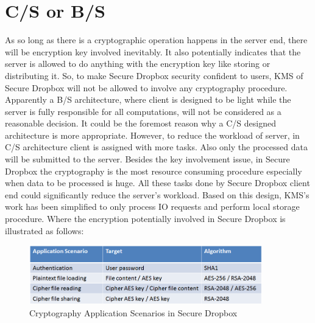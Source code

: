 \section{C/S or B/S}

As so long as there is a cryptographic operation happens in the server end, there will be encryption key involved inevitably. It also potentially indicates that the server is allowed to do anything with the encryption key like storing or distributing it. So, to make Secure Dropbox security confident to users, KMS of Secure Dropbox will not be allowed to involve any cryptography procedure. Apparently a B/S architecture, where client is designed to be light while the server is fully responsible for all computations, will not be considered as a reasonable decision. It could be the foremost reason why a C/S designed architecture is more appropriate. However, to reduce the workload of server, in C/S architecture client is assigned with more tasks. Also only the processed data will be submitted to the server. Besides the key involvement issue, in Secure Dropbox the cryptography is the most resource consuming procedure especially when data to be processed is huge. All these tasks done by Secure Dropbox client end could significantly reduce the server’s workload. Based on this design, KMS’s work has been simplified to only process IO requests and perform local storage procedure. Where the encryption potentially involved in Secure Dropbox is illustrated as follows:

\begin{figure}[h]
        \centering
        \includegraphics[width=0.9\textwidth]{figures/Cryptography_Application_Scenarios_in_Secure_Dropbox.png}
        \caption[Cryptography Deployment] {Cryptography Application Scenarios in Secure Dropbox}
\end{figure}







